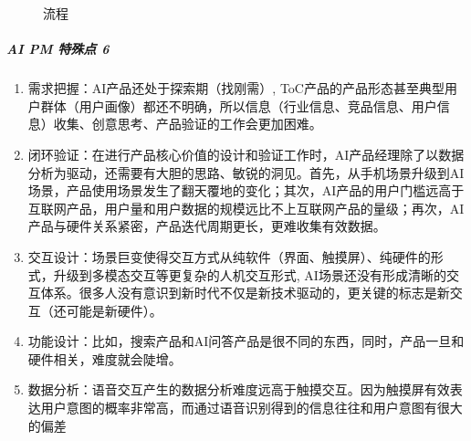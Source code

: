 \documentclass[letterpaper,11pt,english]{sphinxmanual}
\begin{document}
\begin{figure}[H]
\centering
\capstart

\noindent{}
\caption{流程}\label{\detokenize{chapter_project/process:id35}}\end{figure}


\subparagraph{AI PM 特殊点 6\sphinxfootnotemark[724]}
\label{\detokenize{chapter_project/process:ai-pm-6}}%
\begin{footnotetext}[724]\sphinxAtStartFootnote
{}
%
\end{footnotetext}\ignorespaces \begin{enumerate}
%
\item {} 
需求把握：AI产品还处于探索期（找刚需）,
ToC产品的产品形态甚至典型用户群体（用户画像）都还不明确，所以信息（行业信息、竞品信息、用户信息）收集、创意思考、产品验证的工作会更加困难。

\item {} 
闭环验证：在进行产品核心价值的设计和验证工作时，AI产品经理除了以数据分析为驱动，还需要有大胆的思路、敏锐的洞见。首先，从手机场景升级到AI场景，产品使用场景发生了翻天覆地的变化；其次，AI产品的用户门槛远高于互联网产品，用户量和用户数据的规模远比不上互联网产品的量级；再次，AI产品与硬件关系紧密，产品迭代周期更长，更难收集有效数据。

\item {} 
交互设计：场景巨变使得交互方式从纯软件（界面、触摸屏）、纯硬件的形式，升级到多模态交互等更复杂的人机交互形式,
AI场景还没有形成清晰的交互体系。很多人没有意识到新时代不仅是新技术驱动的，更关键的标志是新交互（还可能是新硬件）。

\item {} 
功能设计：比如，搜索产品和AI问答产品是很不同的东西，同时，产品一旦和硬件相关，难度就会陡增。

\item {} 
数据分析：语音交互产生的数据分析难度远高于触摸交互。因为触摸屏有效表达用户意图的概率非常高，而通过语音识别得到的信息往往和用户意图有很大的偏差

\end{enumerate}
\end{document}
